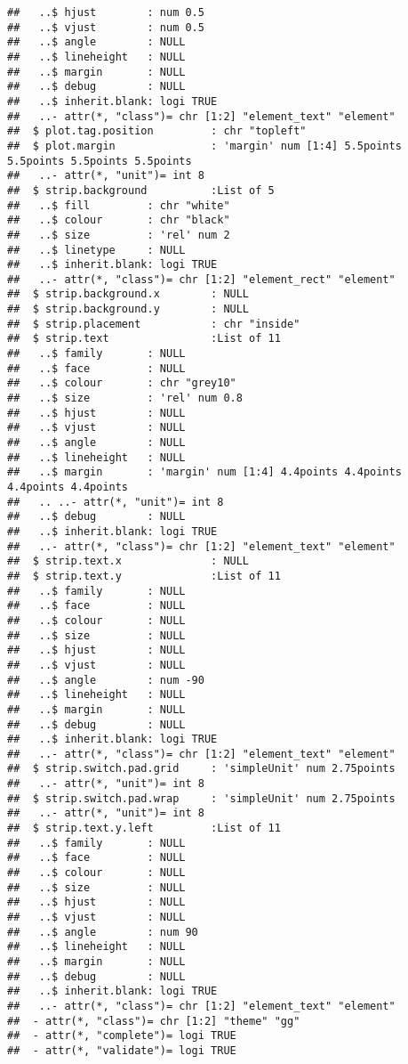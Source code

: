 \documentclass[
]{article}
\begin{document}
\begin{verbatim}
##   ..$ hjust        : num 0.5
##   ..$ vjust        : num 0.5
##   ..$ angle        : NULL
##   ..$ lineheight   : NULL
##   ..$ margin       : NULL
##   ..$ debug        : NULL
##   ..$ inherit.blank: logi TRUE
##   ..- attr(*, "class")= chr [1:2] "element_text" "element"
##  $ plot.tag.position         : chr "topleft"
##  $ plot.margin               : 'margin' num [1:4] 5.5points 5.5points 5.5points 5.5points
##   ..- attr(*, "unit")= int 8
##  $ strip.background          :List of 5
##   ..$ fill         : chr "white"
##   ..$ colour       : chr "black"
##   ..$ size         : 'rel' num 2
##   ..$ linetype     : NULL
##   ..$ inherit.blank: logi TRUE
##   ..- attr(*, "class")= chr [1:2] "element_rect" "element"
##  $ strip.background.x        : NULL
##  $ strip.background.y        : NULL
##  $ strip.placement           : chr "inside"
##  $ strip.text                :List of 11
##   ..$ family       : NULL
##   ..$ face         : NULL
##   ..$ colour       : chr "grey10"
##   ..$ size         : 'rel' num 0.8
##   ..$ hjust        : NULL
##   ..$ vjust        : NULL
##   ..$ angle        : NULL
##   ..$ lineheight   : NULL
##   ..$ margin       : 'margin' num [1:4] 4.4points 4.4points 4.4points 4.4points
##   .. ..- attr(*, "unit")= int 8
##   ..$ debug        : NULL
##   ..$ inherit.blank: logi TRUE
##   ..- attr(*, "class")= chr [1:2] "element_text" "element"
##  $ strip.text.x              : NULL
##  $ strip.text.y              :List of 11
##   ..$ family       : NULL
##   ..$ face         : NULL
##   ..$ colour       : NULL
##   ..$ size         : NULL
##   ..$ hjust        : NULL
##   ..$ vjust        : NULL
##   ..$ angle        : num -90
##   ..$ lineheight   : NULL
##   ..$ margin       : NULL
##   ..$ debug        : NULL
##   ..$ inherit.blank: logi TRUE
##   ..- attr(*, "class")= chr [1:2] "element_text" "element"
##  $ strip.switch.pad.grid     : 'simpleUnit' num 2.75points
##   ..- attr(*, "unit")= int 8
##  $ strip.switch.pad.wrap     : 'simpleUnit' num 2.75points
##   ..- attr(*, "unit")= int 8
##  $ strip.text.y.left         :List of 11
##   ..$ family       : NULL
##   ..$ face         : NULL
##   ..$ colour       : NULL
##   ..$ size         : NULL
##   ..$ hjust        : NULL
##   ..$ vjust        : NULL
##   ..$ angle        : num 90
##   ..$ lineheight   : NULL
##   ..$ margin       : NULL
##   ..$ debug        : NULL
##   ..$ inherit.blank: logi TRUE
##   ..- attr(*, "class")= chr [1:2] "element_text" "element"
##  - attr(*, "class")= chr [1:2] "theme" "gg"
##  - attr(*, "complete")= logi TRUE
##  - attr(*, "validate")= logi TRUE
\end{verbatim}
\end{document}
